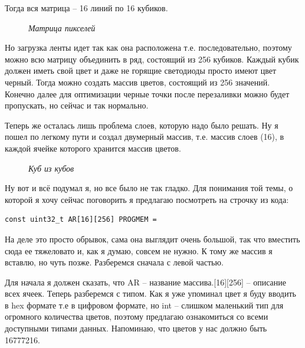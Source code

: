 \documentclass[a4paper, 12pt]{article}
\newcommand{\image}[3]{
	\begin{figure}[ht]
		\center{\texttt{[image: img/\#1]} }
		\caption{\textit{#3}}\end{figure}
}
\begin{document}
Тогда вся матрица -- 16 линий по 16 кубиков.

\image{Матрица.png}{130}{Матрица пикселей}

Но загрузка ленты идет так как она расположена т.е. последовательно, поэтому
можно всю матрицу объединить в ряд, состоящий из 256 кубиков. Каждый кубик
должен иметь свой цвет и даже не горящие светодиоды просто имеют цвет черный.
Тогда можно создать массив цветов, состоящий из 256 значений.
Конечно далее для оптимизации черные точки после перезаливки можно будет
пропускать, но сейчас и так нормально.

Теперь же осталась лишь проблема слоев, которую надо было решать. Ну я пошел
по легкому пути и создал двумерный массив, т.е. массив слоев (16), в каждой
ячейке которого хранится массив цветов.

\image{Куб в кубе.png}{200}{Куб из кубов}

Ну вот и всё подумал я, но все было не так гладко. Для понимания той темы, о
которой я хочу сейчас поговорить я предлагаю посмотреть на строчку из кода:
\begin{lstlisting}[style=myLatexStyle]
const uint32_t AR[16][256] PROGMEM = 
\end{lstlisting}

На деле это просто обрывок, сама она выглядит очень большой, так что вместить
сюда ее тяжеловато и, как я думаю, совсем не нужно. К тому же массив я вставлю,
но чуть позже. Разберемся сначала с левой частью.

Для начала я должен сказать, что AR -- название массива.[16][256] -- описание
всех ячеек. Теперь разберемся с типом. Как я уже упоминал цвет я буду вводить
в hex формате т.е в цифровом формате, но int -- слишком маленький тип для
огромного количества цветов, поэтому предлагаю ознакомиться со всеми доступными
типами данных. Напоминаю, что цветов у нас должно быть 16777216.
\end{document}

